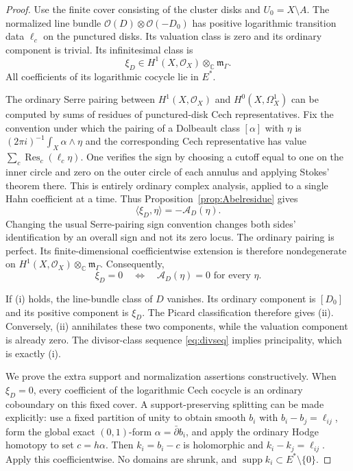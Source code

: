 \documentclass[11pt,letterpaper]{article}
\numberwithin{equation}{section}
\theoremstyle{definition}
\theoremstyle{remark}
\newcommand{\C}{\mathbb C}
\newcommand{\OO}{\mathcal O}
\newcommand{\mm}{\mathfrak m}
\newcommand{\supp}{\operatorname{supp}}
\newcommand{\Res}{\operatorname{Res}}
\newcommand{\db}{\bar\partial}
\newcommand{\mg}{\mm_\Gamma}
\newcommand{\ot}{\otimes_{\C}}
\begin{document}
\begin{proof}
Use the finite cover consisting of the cluster disks and
$U_0=X\setminus A$. The normalized line bundle
$\OO(D)\otimes\OO(-D_0)$ has positive logarithmic transition data
$\ell_c$ on the punctured disks. Its valuation class is zero and its
ordinary component is trivial. Its infinitesimal class is
\begin{equation}
 \xi_D\in H^1(X,\OO_X)\ot\mg.
 \label{eq:xiD}
\end{equation}
All coefficients of its logarithmic cocycle lie in $E^*$.

The ordinary Serre pairing between $H^1(X,\OO_X)$ and
$H^0(X,\Omega_X^1)$ can be computed by sums of residues of punctured-disk
Cech representatives. Fix the convention under which the pairing of a
Dolbeault class $[\alpha]$ with $\eta$ is
$(2\pi i)^{-1}\int_X\alpha\wedge\eta$ and the corresponding Cech
representative has value $\sum_c\Res_c(\ell_c\eta)$.
One verifies the sign by choosing a cutoff equal to one on the inner
circle and zero on the outer circle of each annulus and applying
Stokes' theorem there. This is entirely ordinary complex analysis,
applied to a single Hahn coefficient at a time.
Thus Proposition~\ref{prop:Abelresidue} gives
\begin{equation}
 \langle\xi_D,\eta\rangle=-\mathcal A_D(\eta).
 \label{eq:SerreAbel}
\end{equation}
Changing the usual Serre-pairing sign convention changes both sides'
identification by an overall sign and not its zero locus.
The ordinary pairing is perfect. Its finite-dimensional coefficientwise
extension is therefore nondegenerate on
$H^1(X,\OO_X)\ot\mg$. Consequently,
\[
 \xi_D=0\quad\Longleftrightarrow\quad
      \mathcal A_D(\eta)=0\text{ for every }\eta.
\]

If (i) holds, the line-bundle class of $D$ vanishes. Its ordinary
component is $[D_0]$ and its positive component is $\xi_D$.
The Picard classification therefore gives (ii).
Conversely, (ii) annihilates these two components, while the valuation
component is already zero. The divisor-class sequence
\eqref{eq:divseq} implies principality, which is exactly (i).

We prove the extra support and normalization assertions constructively.
When $\xi_D=0$, every coefficient of the logarithmic Cech cocycle is an
ordinary coboundary on this fixed cover. A support-preserving splitting
can be made explicitly: use a fixed partition of unity to obtain smooth
$b_i$ with $b_i-b_j=\ell_{ij}$, form the global exact $(0,1)$-form
$\alpha=\db b_i$, and apply the ordinary Hodge homotopy to set
$c=h\alpha$. Then $k_i=b_i-c$ is holomorphic and
$k_i-k_j=\ell_{ij}$. Apply this coefficientwise. No domains are shrunk,
and $\supp k_i\subset E^*\setminus\{0\}$.


\end{proof}
\end{document}
